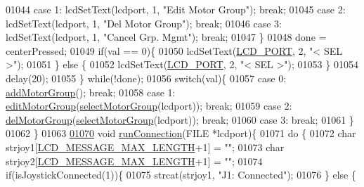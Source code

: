 \begin{DoxyCode}
{{{{{{{{{{{{{{01044             \textcolor{keywordflow}{case} 1: lcdSetText(lcdport, 1, \textcolor{stringliteral}{"Edit Motor Group"}); \textcolor{keywordflow}{break};
01045             \textcolor{keywordflow}{case} 2: lcdSetText(lcdport, 1, \textcolor{stringliteral}{"Del Motor Group"}); \textcolor{keywordflow}{break};
01046             \textcolor{keywordflow}{case} 3: lcdSetText(lcdport, 1, \textcolor{stringliteral}{"Cancel Grp. Mgmt"}); \textcolor{keywordflow}{break};
01047         \}
01048         done = centerPressed;
01049         \textcolor{keywordflow}{if}(val == 0)\{
01050             lcdSetText(\hyperlink{lcdmsg_8h_abcf42bd88b3c36193f301ca25b033875}{LCD\_PORT}, 2, \textcolor{stringliteral}{"<      SEL     >"});
01051         \} \textcolor{keywordflow}{else} \{
01052             lcdSetText(\hyperlink{lcdmsg_8h_abcf42bd88b3c36193f301ca25b033875}{LCD\_PORT}, 2, \textcolor{stringliteral}{"<      SEL     >"});
01053         \}
01054         delay(20);
01055     \} \textcolor{keywordflow}{while}(!done);
01056     \textcolor{keywordflow}{switch}(val)\{
01057         \textcolor{keywordflow}{case} 0: \hyperlink{lcddiag_8c_a9cffea5742f16bfef41b3dcf6d66cd7d}{addMotorGroup}(); \textcolor{keywordflow}{break};
01058         \textcolor{keywordflow}{case} 1: \hyperlink{lcddiag_8c_a8e26ee136d643c9e069d89be0e6b019e}{editMotorGroup}(\hyperlink{lcddiag_8c_a45205137e2aea6d387568cabe3072002}{selectMotorGroup}(lcdport)); \textcolor{keywordflow}{break};
01059         \textcolor{keywordflow}{case} 2: \hyperlink{lcddiag_8c_ac1782b34157c340fc8ae576a55d7d067}{delMotorGroup}(\hyperlink{lcddiag_8c_a45205137e2aea6d387568cabe3072002}{selectMotorGroup}(lcdport)); \textcolor{keywordflow}{break};
01060         \textcolor{keywordflow}{case} 3: \textcolor{keywordflow}{break};
01061     \}
01062 \}
01063 
\hypertarget{lcddiag_8c_source.tex_l01070}{}\hyperlink{lcddiag_8c_ae830c338f6de302a9719b9e7829d9897}{01070} \textcolor{keywordtype}{void} \hyperlink{lcddiag_8c_ae830c338f6de302a9719b9e7829d9897}{runConnection}(FILE *lcdport)\{
01071     \textcolor{keywordflow}{do} \{
01072         \textcolor{keywordtype}{char} strjoy1[\hyperlink{lcdmsg_8h_abe4c4b70fc6f44ae3680e5b2c68cdd00}{LCD\_MESSAGE\_MAX\_LENGTH}+1] = \textcolor{stringliteral}{""};
01073         \textcolor{keywordtype}{char} strjoy2[\hyperlink{lcdmsg_8h_abe4c4b70fc6f44ae3680e5b2c68cdd00}{LCD\_MESSAGE\_MAX\_LENGTH}+1] = \textcolor{stringliteral}{""};
01074         \textcolor{keywordflow}{if}(isJoystickConnected(1))\{
01075             strcat(strjoy1, \textcolor{stringliteral}{"J1: Connected"});
01076         \} \textcolor{keywordflow}{else} \{
}}}}}}}}}}}}}}
\end{DoxyCode}
